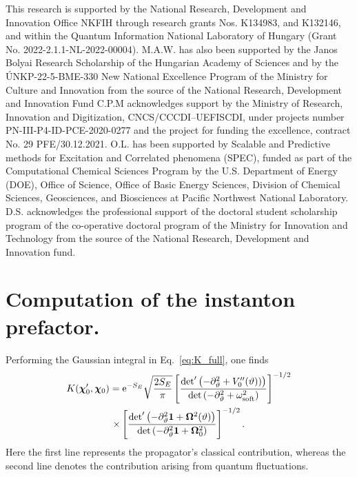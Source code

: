 \documentclass[aps, prb, floatfix, twocolumn, notitlepage, superscriptaddress, 10pt]{revtex4-2}
\newcommand{\e}{\text e}
\newcommand{\1}{{1\hspace*{-0.5ex} \textrm{l} \hspace*{0.5ex}}}
\begin{document}
\acknowledgments
This research is supported by the National Research, Development and Innovation Office NKFIH through research grants 
Nos. K134983, and  %
K132146,  %
and within the Quantum Information National Laboratory of Hungary (Grant No. 2022-2.1.1-NL-2022-00004). 
%
M.A.W. has also been supported by the Janos Bolyai Research Scholarship of the
Hungarian Academy of Sciences and by the ÚNKP-22-5-BME-330 New National Excellence Program of the Ministry for Culture and Innovation from the source of the National Research, Development and Innovation Fund
%
C.P.M acknowledges support by the Ministry of Research, Innovation and Digitization, CNCS/CCCDI–UEFISCDI, 
under projects number PN-III-P4-ID-PCE-2020-0277 and the project for funding the excellence, contract 
No. 29 PFE/30.12.2021. 
O.L. has been supported by
Scalable and Predictive methods for Excitation and Correlated phenomena 
(SPEC), funded as part of the Computational Chemical Sciences Program by 
the U.S. Department of Energy (DOE), Office of Science, Office of Basic 
Energy Sciences, Division of Chemical Sciences, Geosciences, and 
Biosciences at Pacific Northwest National Laboratory.
%
D.S. acknowledges the professional support of the doctoral student scholarship program of the co-operative doctoral program of the Ministry for Innovation and Technology from the source of the National Research, Development and Innovation fund.
%
\appendix

\section{Computation of the instanton prefactor.}\label{app:prefactor}
Performing the Gaussian integral in Eq.~\eqref{eq:K_full}, one finds \cite{Milnikov.2001}
\begin{gather}
K(\mathbold{\chi}_0^\prime, \mathbold{\chi}_0) = \e^{-S_E} \sqrt{ \frac{2S_E}{\pi}} \left[ \frac{\det^\prime \left(-\partial_\vartheta^2 + V^{\prime \prime}_0 (\vartheta))   \right)}{\det\left(-\partial_\vartheta^2 + 
\omega^2_{\rm{soft}}   \right)}  \right]^{-1/2} \label{eq:K_sep} \\
\times\left[  \frac{\det^\prime \left(-\partial_\vartheta^2 {\bf{1}} + {\bf{\Omega}}^2 (\vartheta)   \right)}{\det\left(-\partial_\vartheta^2 {\bf{1}}+ {\bf{\Omega}}^2_0   \right)}   \right]^{-1/2}.\nonumber
\end{gather}
Here the first line represents the propagator's classical contribution, whereas the second line 
denotes the contribution arising from quantum fluctuations.
\end{document}
